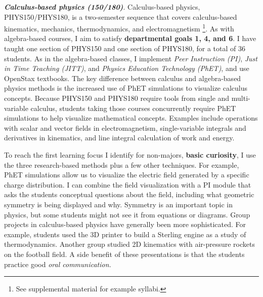 \documentclass[../../../main.tex]{subfiles}
\begin{document}
\textbf{\textit{Calculus-based physics (150/180)}}. Calculus-based physics, PHYS150/PHYS180, is a two-semester sequence that covers calculus-based kinematics, mechanics, thermodynamics, and electromagnetism \footnote{See supplemental material for example syllabi.}.  As with algebra-based courses, I aim to satisfy \textbf{departmental goals 1, 4, and 6}.  I have taught one section of PHYS150 and one section of PHYS180, for a total of 36 students.  As in the algebra-based classes, I implement \textit{Peer Instruction (PI)}, \textit{Just in Time Teaching (JITT)}, and \textit{Physics Education Technology (PhET)}, and use OpenStax textbooks.  The key difference between calculus and algebra-based physics methods is the increased use of PhET simulations to visualize calculus concepts.  Because PHYS150 and PHYS180 require tools from single and multi-variable calculus, students taking those courses concurrently require PhET simulations to help visualize mathematical concepts.  Examples include operations with scalar and vector fields in electromagnetism, single-variable integrals and derivatives in kinematics, and line integral calculation of work and energy. \\ \hspace{0.1cm}

To reach the first learning focus I identify for non-majors, \textbf{basic curiosity}, I use the three research-based methods plus a few other techniques.  For example, PhET simulations allow us to visualize the electric field generated by a specific charge distribution.  I can combine the field visualization with a PI module that asks the students conceptual questions about the field, including what geometric symmetry is being displayed and why.  Symmetry is an important topic in physics, but some students might not see it from equations or diagrams.  Group projects in calculus-based physics have generally been more sophisticated.  For example, students used the 3D printer to build a Sterling engine as a study of thermodynamics.  Another group studied 2D kinematics with air-pressure rockets on the football field.  A side benefit of these presentations is that the students practice good \textit{oral communication.} \\ \hspace{0.1cm}
\end{document}
